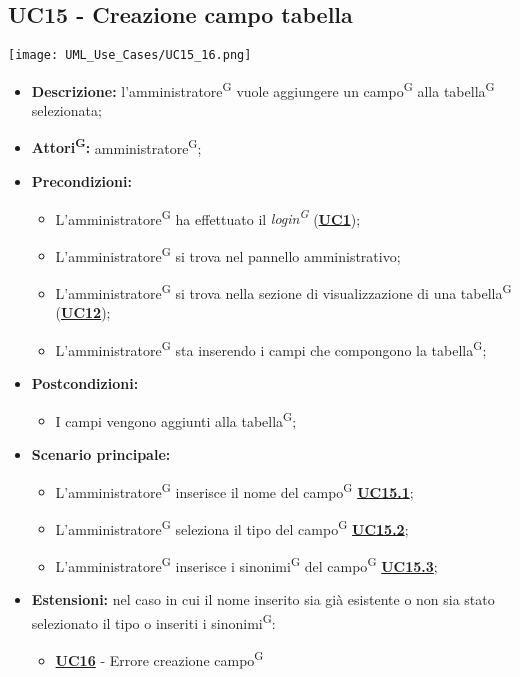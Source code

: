 \subsection{UC15 - Creazione campo tabella}
\label{sec:UC15}
\texttt{[image: UML\_Use\_Cases/UC15\_16.png]}
\begin{itemize}
	\item \textbf{Descrizione:} l’amministratore\textsuperscript{G} vuole aggiungere un campo\textsuperscript{G} alla tabella\textsuperscript{G} selezionata;
	\item \textbf{Attori\textsuperscript{G}:} amministratore\textsuperscript{G};
	\item \textbf{Precondizioni:} 
	\begin{itemize}
		\item L’amministratore\textsuperscript{G} ha effettuato il \textit{login\textsuperscript{G}} (\hyperref[sec:UC1]{\textbf{UC1}});
		\item L’amministratore\textsuperscript{G} si trova nel pannello amministrativo;
		\item L’amministratore\textsuperscript{G} si trova nella sezione di visualizzazione di una tabella\textsuperscript{G} (\hyperref[sec:UC12]{\textbf{UC12}});
		\item L’amministratore\textsuperscript{G} sta inserendo i campi che compongono la tabella\textsuperscript{G};
	\end{itemize}
	\item \textbf{Postcondizioni:} 
	\begin{itemize}
		\item I campi vengono aggiunti alla tabella\textsuperscript{G};
	\end{itemize}
	\item \textbf{Scenario principale:} 
	\begin{itemize}
		\item L’amministratore\textsuperscript{G} inserisce il nome del campo\textsuperscript{G} \hyperref[sec:UC15.1]{\textbf{UC15.1}};
		\item L'amministratore\textsuperscript{G} seleziona il tipo del campo\textsuperscript{G} \hyperref[sec:UC15.2]{\textbf{UC15.2}};
		\item L'amministratore\textsuperscript{G} inserisce i sinonimi\textsuperscript{G} del campo\textsuperscript{G} \hyperref[sec:UC15.3]{\textbf{UC15.3}};
	\end{itemize}
	\item \textbf{Estensioni:} nel caso in cui il nome inserito sia già esistente o non sia stato selezionato il tipo o inseriti i sinonimi\textsuperscript{G}:
	\begin{itemize}
		\item \hyperref[sec:UC16]{\textbf{UC16}} - Errore creazione campo\textsuperscript{G}
	\end{itemize}
\end{itemize}

